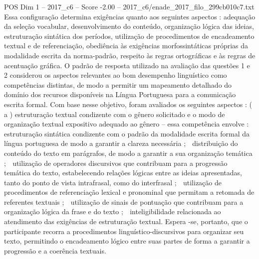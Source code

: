 \begin{textsample}{POS Dim 1 – 2017\_c6 – Score -2.00 – 2017\_c6/enade\_2017\_filo\_299cb010c7.txt}
Essa configuração determina exigências quanto aos seguintes aspectos : adequação da seleção vocabular, desenvolvimento do conteúdo, organização lógica das ideias, estruturação sintática dos períodos, utilização de procedimentos de encadeamento textual e de referenciação, obediência às exigências morfossintáticas próprias da modalidade escrita da norma-padrão, respeito às regras ortográficas e às regras de acentuação gráfica.
O padrão de resposta utilizado na avaliação das questões 1 e 2 considerou os aspectos relevantes ao bom desempenho linguístico como competências distintas, de modo a permitir um mapeamento detalhado do domínio dos recursos disponíveis na Língua Portuguesa para a comunicação escrita formal.
Com base nesse objetivo, foram avaliados os seguintes aspectos : ( a ) estruturação textual condizente com o gênero solicitado e o modo de organização textual expositivo adequado ao gênero – essa competência envolve :  estruturação sintática condizente com o padrão da modalidade escrita formal da língua portuguesa de modo a garantir a clareza necessária ;  distribuição do conteúdo do texto em parágrafos, de modo a garantir a sua organização temática ;  utilização de operadores discursivos que contribuam para a progressão temática do texto, estabelecendo relações lógicas entre as ideias apresentadas, tanto do ponto de vista intrafrasal, como do interfrasal ;  utilização de procedimentos de referenciação lexical e pronominal que permitam a retomada de referentes textuais ;  utilização de sinais de pontuação que contribuam para a organização lógica da frase e do texto ;  inteligibilidade relacionada ao atendimento das exigências de estruturação textual.
Espera -se, portanto, que o participante recorra a procedimentos linguístico-discursivos para organizar seu texto, permitindo o encadeamento lógico entre suas partes de forma a garantir a progressão e a coerência textuais.

\end{textsample}
